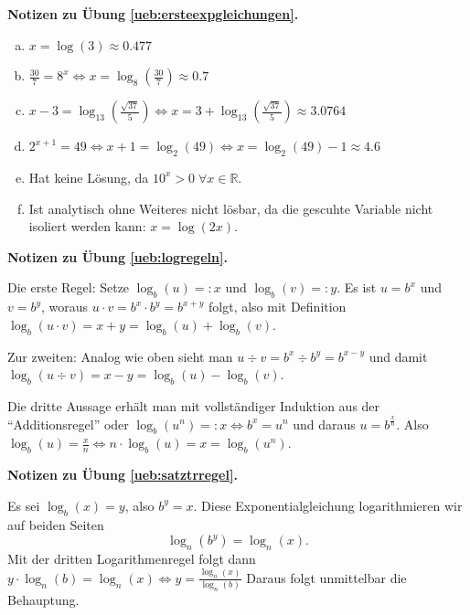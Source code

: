 \documentclass[%
11pt,%
twoside,%
titlepage,%
swissgerman,%
headsepline%
]{scrartcl}
\newcommand{\faReturnGray}{\textcolor{gray}{\faMailReply}} %
\theoremstyle{definition}
\theoremstyle{plain}
\newcommand{\concatueb}[1]{ueb:#1}%
\newcommand{\concatlsg}[1]{lsg:#1}%
\newenvironment{lsg}[1]{%
    \par\noindent\textbf{Notizen zu Übung \ref{\concatueb{#1}}.}%
    \label{\concatlsg{#1}} %
    \hfill\hyperref[\concatueb{#1}]{\faReturnGray}\par %
}{%
    \par%
}
\begin{document}
\begin{lsg}{ersteexpgleichungen}
    \begin{enumerate}[a)]
        \item $x=\log(3)\approx0.477$
        \item $\frac{30}{7}=8^x\Leftrightarrow x=\log_8(\frac{30}{7})\approx0.7$
        \item $x-3=\log_{13}(\frac{\sqrt{37}}{5})\Leftrightarrow x=3+\log_{13}(\frac{\sqrt{37}}{5})\approx3.0764$
        \item $2^{x+1}=49\Leftrightarrow x+1=\log_2(49)\Leftrightarrow x=\log_2(49)-1\approx4.6$
        \item Hat keine Lösung, da $10^x>0\;\forall x\in\mathbb{R}$.
        \item Ist analytisch ohne Weiteres nicht lösbar, da die gescuhte Variable nicht isoliert werden kann: $x=\log(2x)$.
    \end{enumerate}    
\end{lsg}

\begin{lsg}{logregeln}
    Die erste Regel: Setze $\log_b(u)=:x$ und $\log_b(v)=:y$. Es ist $u=b^x$ und $v=b^y$, woraus $u\cdot v=b^x\cdot b^y=b^{x+y}$ folgt, also mit Definition $\log_b(u\cdot v)=x+y=\log_b(u)+\log_b(v)$.
    
    Zur zweiten: Analog wie oben sieht man $u\div v=b^x\div b^y=b^{x-y}$ und damit $\log_b(u\div v)=x-y=\log_b(u)-\log_b(v)$.

    Die dritte Aussage erhält man mit vollständiger Induktion aus der \enquote{Additionsregel} oder $\log_b(u^n)=:x\Leftrightarrow b^x=u^n$ und daraus $u=b^\frac{x}{n}$. Also $\log_b(u)=\frac{x}{n}\Leftrightarrow n\cdot\log_b(u)=x=\log_b(u^n)$.
\end{lsg}

\begin{lsg}{satztrregel}
  Es sei $\log_b{(x)} = y$, also
  $b^y=x$. Diese Exponentialgleichung logarithmieren wir auf beiden Seiten
  $$\log_n{(b^y)}=\log_n{(x)}.$$ Mit der dritten Logarithmenregel folgt dann
  $y\cdot\log_n{(b)}=\log_n{(x)}\Leftrightarrow
  y=\frac{\log_n{(x)}}{\log_n{(b)}}$
  Daraus folgt unmittelbar die Behauptung.
\end{lsg}
\end{document}
